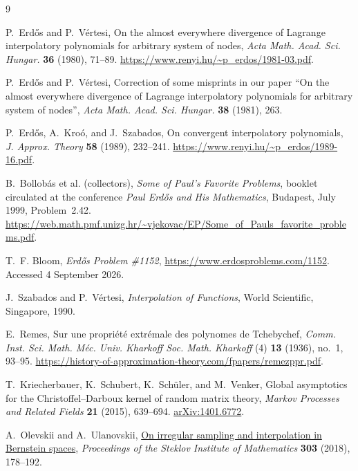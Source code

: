 \documentclass[11pt]{article}
\theoremstyle{definition}
\numberwithin{equation}{section}
\begin{document}
\begin{thebibliography}{9}

P.~Erd\H{o}s and P.~V\'ertesi,
On the almost everywhere divergence of Lagrange interpolatory polynomials
for arbitrary system of nodes,
\emph{Acta Math. Acad. Sci. Hungar.} \textbf{36} (1980), 71--89.
\url{https://www.renyi.hu/~p_erdos/1981-03.pdf}.

P.~Erd\H{o}s and P.~V\'ertesi,
Correction of some misprints in our paper ``On the almost everywhere
divergence of Lagrange interpolatory polynomials for arbitrary system of
nodes'',
\emph{Acta Math. Acad. Sci. Hungar.} \textbf{38} (1981), 263.

P.~Erd\H{o}s, A.~Kro\'o, and J.~Szabados,
On convergent interpolatory polynomials,
\emph{J. Approx. Theory} \textbf{58} (1989), 232--241.
\url{https://www.renyi.hu/~p_erdos/1989-16.pdf}.

B.~Bollob\'as et al. (collectors),
\emph{Some of Paul's Favorite Problems},
booklet circulated at the conference \emph{Paul Erd\H{o}s and His Mathematics},
Budapest, July 1999, Problem~2.42.
\url{https://web.math.pmf.unizg.hr/~vjekovac/EP/Some_of_Pauls_favorite_problems.pdf}.

T.~F. Bloom,
\emph{Erd\H{o}s Problem \#1152},
\url{https://www.erdosproblems.com/1152}.
Accessed 4 September 2026.

J.~Szabados and P.~V\'ertesi,
\emph{Interpolation of Functions},
World Scientific, Singapore, 1990.

E.~Remes,
Sur une propri\'et\'e extr\'emale des polynomes de Tchebychef,
\emph{Comm. Inst. Sci. Math. M\'ec. Univ. Kharkoff Soc. Math. Kharkoff}
(4) \textbf{13} (1936), no.~1, 93--95.
\url{https://history-of-approximation-theory.com/fpapers/remezppr.pdf}.

T.~Kriecherbauer, K.~Schubert, K.~Sch\"uler, and M.~Venker,
Global asymptotics for the Christoffel--Darboux kernel of random
matrix theory,
\emph{Markov Processes and Related Fields} \textbf{21} (2015),
639--694.
\href{https://arxiv.org/abs/1401.6772}{arXiv:1401.6772}.

A.~Olevskii and A.~Ulanovskii,
\href{https://doi.org/10.1134/S0081543818080151}
{On irregular sampling and interpolation in Bernstein spaces},
\emph{Proceedings of the Steklov Institute of Mathematics}
\textbf{303} (2018), 178--192.

\end{thebibliography}
\end{document}
